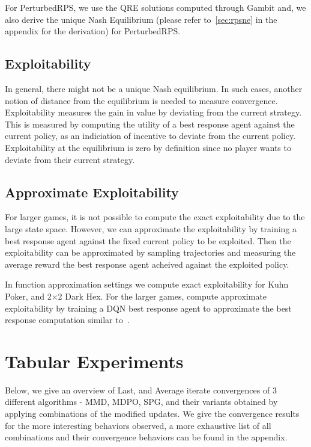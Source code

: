 For PerturbedRPS, we use the QRE solutions computed through Gambit and, we also derive the unique
Nash Equilibrium (please refer to~\ref{sec:rpsne} in the appendix for the derivation) for
PerturbedRPS.\

\subsection{Exploitability}
In general, there might not be a unique Nash equilibrium. 
In such cases, another notion of distance from the equilibrium is needed to measure convergence. 
Exploitability measures the gain in value by deviating from the current strategy. 
This is measured by computing the utility of a best response agent against the current policy, as an indiciation 
of incentive to deviate from the current policy.
Exploitability at the equilibrium is zero by definition since no player wants to deviate from their current strategy.

\subsection{Approximate Exploitability}
For larger games, it is not possible to compute the exact exploitability due to the large state space. 
However, we can approximate the exploitability by training a best response agent against the fixed current policy to be exploited. 
Then the exploitability can be approximated by sampling trajectories and measuring the average reward the best response 
agent acheived against the exploited policy.

In function approximation settings we compute exact exploitability for Kuhn Poker,
and 2$\times$2 Dark Hex.
For the larger games, compute approximate exploitability by training a DQN best response agent to approximate
the best response computation similar to~\cite{sokotaUnified2023}.

\section{Tabular Experiments}

Below, we give an overview of Last, and Average iterate convergences of 3 different algorithms -
MMD, MDPO, SPG, and their variants obtained by applying combinations of the modified updates.
We give the convergence results for the more interesting behaviors observed, a more exhaustive list
of all combinations and their convergence behaviors can be found in the appendix.

